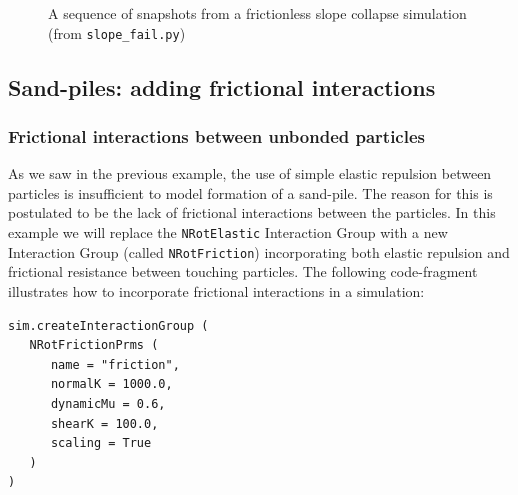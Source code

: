 \begin{figure}
\caption{A sequence of snapshots from a frictionless slope collapse simulation (from \texttt{slope\_\+fail.py})} \label{fig:slope_fail_pics}
\end{figure}

\subsection{Sand-piles: adding frictional interactions}

\subsubsection{Frictional interactions between unbonded particles}

As we saw in the previous example, the use of simple elastic repulsion between particles is insufficient to model formation of a sand-pile. The reason for this is postulated to be the lack of frictional interactions between the particles. In this example we will replace the \texttt{NRotElastic} Interaction Group with a new Interaction Group (called \texttt{NRotFriction}) incorporating both elastic repulsion and frictional resistance between touching particles. The following code-fragment illustrates how to incorporate frictional interactions in a simulation:

\begin{verbatim}
sim.createInteractionGroup (
   NRotFrictionPrms (
      name = "friction",
      normalK = 1000.0,
      dynamicMu = 0.6,
      shearK = 100.0,
      scaling = True
   )
)
\end{verbatim}

